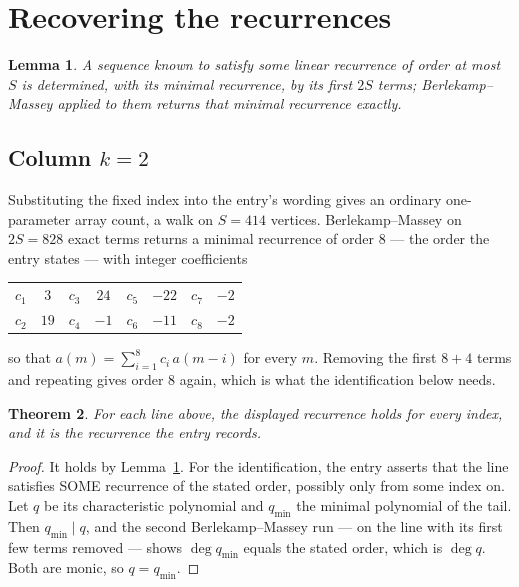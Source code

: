 \documentclass[11pt,a4paper]{article}
\theoremstyle{plain}
\newtheorem{theorem}{Theorem}
\newtheorem{lemma}[theorem]{Lemma}
\theoremstyle{definition}
\begin{document}
\section{Recovering the recurrences}

\begin{lemma}\label{lem:bm}
A sequence known to satisfy some linear recurrence of order at most $S$ is determined, with its
minimal recurrence, by its first $2S$ terms; Berlekamp--Massey applied to them returns that
minimal recurrence exactly.
\end{lemma}

\subsection*{Column $k=2$}
Substituting the fixed index into the entry's wording gives an ordinary one-parameter array
count, a walk on $S=414$ vertices. Berlekamp--Massey on $2S=828$ exact terms
returns a minimal recurrence of order $8$ --- the order the entry states --- with
integer coefficients
\begin{center}\small\begin{tabular}{cccccccc}
$c_{1}$ & $3$ & $c_{3}$ & $24$ & $c_{5}$ & $-22$ & $c_{7}$ & $-2$ \\
$c_{2}$ & $19$ & $c_{4}$ & $-1$ & $c_{6}$ & $-11$ & $c_{8}$ & $-2$ \\
\end{tabular}\end{center}
so that $a(m)=\sum_{i=1}^{8}c_i\,a(m-i)$ for every $m$. Removing the first
$8+4$ terms and repeating gives order $8$ again, which is what the
identification below needs.

\begin{theorem}
For each line above, the displayed recurrence holds for every index, and it is the recurrence
the entry records.
\end{theorem}

\begin{proof}
It holds by Lemma~\ref{lem:bm}. For the identification, the entry asserts that the line
satisfies SOME recurrence of the stated order, possibly only from some index on. Let $q$ be its
characteristic polynomial and $q_{\min}$ the minimal polynomial of the tail. Then
$q_{\min}\mid q$, and the second Berlekamp--Massey run --- on the line with its first few
terms removed --- shows $\deg q_{\min}$ equals the stated order, which is $\deg q$. Both are
monic, so $q=q_{\min}$.
\end{proof}
\end{document}
